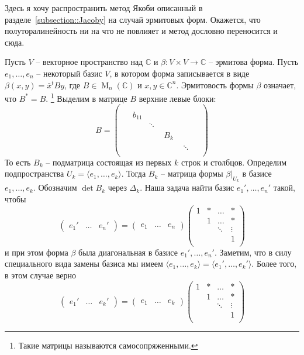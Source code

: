 Здесь я хочу распространить метод Якоби описанный в разделе~\ref{subsection::Jacoby} на случай эрмитовых форм.
Окажется, что полуторалинейность ни на что не повлияет и метод дословно переносится и сюда.

Пусть $V$ -- векторное пространство над $\mathbb C$ и $\beta\colon V\times V\to \mathbb C$ -- эрмитова форма.
Пусть $e_1,\ldots,e_n$ -- некоторый базис $V$, в котором форма записывается в виде $\beta(x, y) = \bar x^t B y$, где $B\in \operatorname{M}_{n}(\mathbb C)$ и $x,y\in \mathbb C^n$.
Эрмитовость формы $\beta$ означает, что $B^* = B$.%
\footnote{Такие матрицы называются самосопряженными.}
Выделим в матрице $B$ верхние левые блоки:
\[
B =
\begin{pmatrix}
{\boxed{
\begin{matrix}
{
\boxed{
\begin{matrix}
{
\boxed{
\begin{matrix}
{\boxed{b_{11}}}&{}\\
{}&{\ddots}
\end{matrix}
}
}&{}\\
{}&{B_k}
\end{matrix}
}
}&{}\\
{}&{\ddots}
\end{matrix}
}
}&{}\\
{}&{}
\end{pmatrix}
\]
То есть $B_k$ -- подматрица состоящая из первых $k$ строк и столбцов.
Определим подпространства $U_k = \langle e_1,\ldots,e_k\rangle$.
Тогда $B_k$ -- матрица формы $\beta|_{U_k}$ в базисе $e_1,\ldots,e_k$.
Обозначим $\det B_k$ через $\Delta_k$.
Наша задача найти базис $e_1',\ldots,e_n'$ такой, чтобы
\[
\begin{pmatrix}
{e_1'}&{\ldots}&{e_n'}
\end{pmatrix}
=
\begin{pmatrix}
{e_1}&{\ldots}&{e_n}
\end{pmatrix}
\begin{pmatrix}
{1}&{*}&{\ldots}&{*}\\
{}&{1}&{\ldots}&{*}\\
{}&{}&{\ddots}&{\vdots}\\
{}&{}&{}&{1}\\
\end{pmatrix}
\]
и при этом форма $\beta$ была диагональная в базисе $e_1',\ldots,e_n'$.
Заметим, что в силу специального вида замены базиса мы имеем $\langle e_1,\ldots,e_k \rangle = \langle e_1', \ldots,e_k'\rangle$.
Более того, в этом случае верно
\[
\begin{pmatrix}
{e_1'}&{\ldots}&{e_k'}
\end{pmatrix}
=
\begin{pmatrix}
{e_1}&{\ldots}&{e_k}
\end{pmatrix}
\begin{pmatrix}
{1}&{*}&{\ldots}&{*}\\
{}&{1}&{\ldots}&{*}\\
{}&{}&{\ddots}&{\vdots}\\
{}&{}&{}&{1}\\
\end{pmatrix}
\]
